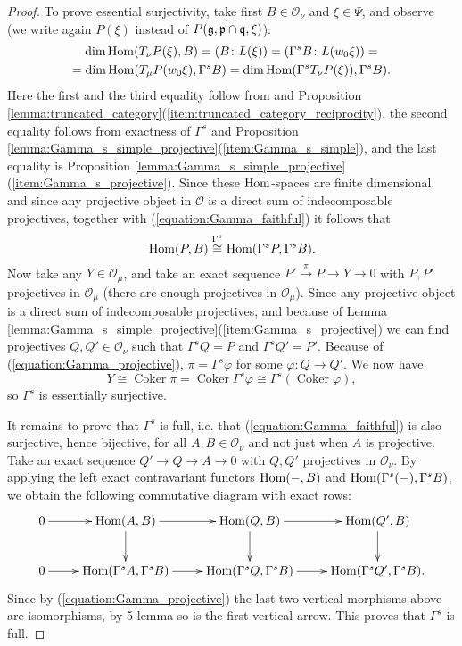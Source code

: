 \documentclass[a4paper,10pt]{article}
\begin{document}
\begin{proof}
To prove essential surjectivity, take first $B \in \mathcal{O}_\nu$ and $\xi \in \Psi$, and observe (we write again $P(\xi)$ instead of $P(\mathfrak{g,p\cap q},\xi)$):
%
\begin{multline*} \dim \mathrm{Hom}(T_\nu P(\xi),B) = (B \colon L(\xi)) =  (\Gamma^s B \colon L(w_0\xi)) = \\ = \dim \mathrm{Hom}(T_\mu P(w_0\xi),\Gamma^s B) = \dim \mathrm{Hom}(\Gamma^s T_\nu P(\xi)),\Gamma^s B). \end{multline*}
%
Here the first and the third equality follow from \cite[9.8.]{hum} and Proposition \ref{lemma:truncated_category}(\ref{item:truncated_category_reciprocity}), the second equality follows from exactness of $\Gamma^s$ and Proposition \ref{lemma:Gamma_s_simple_projective}(\ref{item:Gamma_s_simple}), and the last equality is Proposition \ref{lemma:Gamma_s_simple_projective}(\ref{item:Gamma_s_projective}). Since these $\mathrm{Hom}$-spaces are finite dimensional, and since any projective object in $\mathcal{O}$ is a direct sum of indecomposable projectives, together with (\ref{equation:Gamma_faithful}) it follows that
%
\begin{equation}
\label{equation:Gamma_projective}
\mathrm{Hom}(P,B) \stackrel{\Gamma^s}{\cong} \mathrm{Hom}(\Gamma^s P,\Gamma^s B).
\end{equation}
%
Now take any $Y \in \mathcal{O}_\mu$, and take an exact sequence $P' \stackrel{\pi}{\to} P \to Y \to 0$ with $P, P'$ projectives in $\mathcal{O}_\mu$ (there are enough projectives in $\mathcal{O}_\mu$). Since any projective  object is a direct sum of indecomposable projectives, and because of Lemma \ref{lemma:Gamma_s_simple_projective}(\ref{item:Gamma_s_projective}) we can find projectives $Q, Q' \in \mathcal{O}_\nu$ such that $\Gamma^s Q=P$ and $\Gamma^s Q'=P'$. Because of (\ref{equation:Gamma_projective}), $\pi = \Gamma^s \varphi$ for some $\varphi \colon Q \to Q'$. We now have
%
\[ Y \cong \operatorname{Coker} \pi = \operatorname{Coker} \Gamma^s \varphi \cong \Gamma^s (\operatorname{Coker} \varphi), \]
%
so $\Gamma^s$ is essentially surjective.

It remains to prove that $\Gamma^s$ is full, i.e. that (\ref{equation:Gamma_faithful}) is also surjective, hence bijective, for all $A,B \in \mathcal{O}_\nu$ and not just when $A$ is projective. Take an exact sequence $Q' \to Q \to A \to 0$ with $Q, Q'$ projectives in $\mathcal{O}_\nu$. By applying the left exact contravariant functors $\mathrm{Hom}(-,B)$ and $\mathrm{Hom}(\Gamma^s(-),\Gamma^sB)$, we obtain the following commutative diagram with exact rows:
%
\[ \xymatrix{ 0 \ar[r] & \Hom(A,B) \ar[d] \ar[r] & \Hom(Q,B) \ar[d] \ar[r] & \Hom(Q',B) \ar[d] \\
0 \ar[r] & \Hom(\Gamma^sA,\Gamma^sB) \ar[r] & \Hom(\Gamma^sQ,\Gamma^sB) \ar[r] & \Hom(\Gamma^sQ',\Gamma^sB) . } \]
%
Since by (\ref{equation:Gamma_projective}) the last two vertical morphisms above are isomorphisms, by 5-lemma so is the first vertical arrow. This proves that $\Gamma^s$ is full.
\end{proof}
\end{document}
